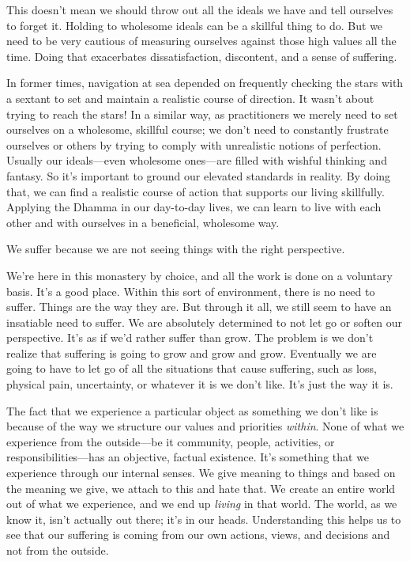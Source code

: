 This doesn't mean we should throw out all the ideals we have and tell 
ourselves to forget it. Holding to wholesome ideals can be a skillful 
thing to do. But we need to be very cautious of measuring ourselves 
against those high values all the time. Doing that exacerbates 
dissatisfaction, discontent, and a sense of suffering.

In former times, navigation at sea depended on frequently checking the 
stars with a sextant to set and maintain a realistic course of 
direction. It wasn't about trying to reach the stars! In a similar way, 
as practitioners we merely need to set ourselves on a wholesome, 
skillful course; we don't need to constantly frustrate ourselves or 
others by trying to comply with unrealistic notions of perfection. 
Usually our ideals---even wholesome ones---are filled with wishful 
thinking and fantasy. So it's important to ground our elevated 
standards in reality. By doing that, we can find a realistic course of 
action that supports our living skillfully. Applying the Dhamma in our 
day-to-day lives, we can learn to live with each other and with 
ourselves in a beneficial, wholesome way.


We suffer because we are not seeing things with the right perspective.

We're here in this monastery by choice, and all the work is done on a 
voluntary basis. It's a good place. Within this sort of environment, 
there is no need to suffer. Things are the way they are. But through it 
all, we still seem to have an insatiable need to suffer. We are 
absolutely determined to not let go or soften our perspective. It's as 
if we'd rather suffer than grow. The problem is we don't realize that 
suffering is going to grow and grow and grow. Eventually we are going 
to have to let go of all the situations that cause suffering, such as 
loss, physical pain, uncertainty, or whatever it is we don't like. It's 
just the way it is.

The fact that we experience a particular object as something we don't 
like is because of the way we structure our values and priorities 
\emph{within}. None of what we experience from the outside---be it 
community, people, activities, or responsibilities---has an objective, 
factual existence. It's something that we experience through our 
internal senses. We give meaning to things and based on the meaning we 
give, we attach to this and hate that. We create an entire world out of 
what we experience, and we end up \emph{living} in that world. The 
world, as we know it, isn't actually out there; it's in our heads. 
Understanding this helps us to see that our suffering is coming from 
our own actions, views, and decisions and not from the outside.

